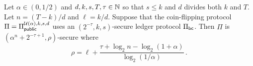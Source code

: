 \begin{proposition}\label{prop:coin-tossing-security-public}
  Let $\alpha \in (0, 1/2)$ and $d, k, s, T, \tau \in \mathbb{N}$ 
  so that 
  $s \leq k$ and 
  $d$ divides both $k$ and $T$. 
  Let $n = (T - k)/d$ and $\ell = k/d$. 
  Suppose that the coin-flipping protocol $\Pi = \Pi_\mathsf{public}^{\mathcal{U}(\alpha),k,s,d}$ 
  uses an $(2^{-\tau}, k, s)$-secure ledger protocol $\Pi_\mathsf{bc}$.
  Then $\Pi$ is $(\alpha^n + 2^{-\tau + 1}, \rho)$-secure 
  where 
  \begin{equation}\label{eq:minentropy-loss-Bernoulli}
    \rho = \ell + \frac{\tau + \log_2 n - \log_2 (1 + \alpha)}{\log_2 (1/\alpha)}    \,.
  \end{equation}
\end{proposition}
